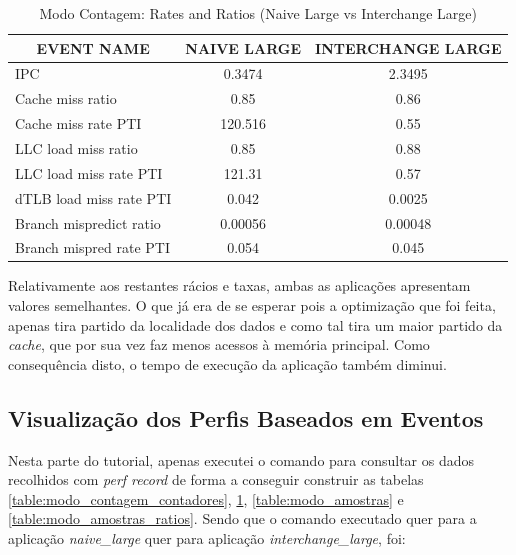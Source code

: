 \documentclass[conference,compsoc]{IEEEtran}
\begin{document}
\begin{table}[h!]
\centering
\scriptsize
\begin{tabular}{|l|c|c|}
\hline
\multicolumn{1}{|c|}{\textbf{EVENT NAME}} & \textbf{NAIVE LARGE} & \textbf{INTERCHANGE LARGE} \\ \hline
IPC                                       & 0.3474               & 2.3495                     \\ \hline
Cache miss ratio                          & 0.85                 & 0.86                       \\ \hline
Cache miss rate PTI                       & 120.516              & 0.55                       \\ \hline
LLC load miss ratio                       & 0.85                 & 0.88                       \\ \hline
LLC load miss rate PTI                    & 121.31               & 0.57                       \\ \hline
dTLB load miss rate PTI                   & 0.042                & 0.0025                     \\ \hline
Branch mispredict ratio                   & 0.00056              & 0.00048                    \\ \hline
Branch mispred rate PTI                   & 0.054                & 0.045                      \\ \hline
\end{tabular}
\caption{Modo Contagem: Rates and Ratios (Naive Large vs Interchange Large)}
\label{table:modo_contagem_rates}
\end{table}

Relativamente aos restantes rácios e taxas, ambas as aplicações apresentam valores semelhantes. O que já era de se esperar pois a optimização que foi feita, apenas tira partido da localidade dos dados e como tal tira um maior partido da \textit{cache}, que por sua vez faz menos acessos à memória principal. Como consequência disto, o tempo de execução da aplicação também diminui.

\subsection{Visualização dos Perfis Baseados em Eventos}

Nesta parte do tutorial, apenas executei o comando para consultar os dados recolhidos com \textit{perf record} de forma a conseguir construir as tabelas \ref{table:modo_contagem_contadores}, \ref{table:modo_contagem_rates}, \ref{table:modo_amostras} e \ref{table:modo_amostras_ratios}. Sendo que o comando executado quer para a aplicação \textit{naive\_large} quer para aplicação \textit{interchange\_large}, foi:
\end{document}
